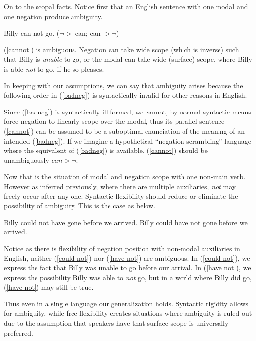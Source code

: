 \documentclass{article}
\begin{document}
On to the scopal facts. Notice first that an English sentence with one modal and one negation produce ambiguity.

\begin{exe}
\ex Billy can not go. \label{cannot}\hfill ($\neg >$ can; can $> \neg$) 
\end{exe}

(\ref{cannot}) is ambiguous. Negation can take wide scope (which is inverse) such that Billy is \emph{unable} to go, or the modal can take wide (surface) scope, where Billy is able \emph{not} to go, if he so pleases.

In keeping with our assumptions, we can say that ambiguity arises because the following order in (\ref{badneg}) is syntactically invalid for other reasons in English.

\begin{exe}
\end{exe}

Since (\ref{badneg}) is syntactically ill-formed, we cannot, by normal syntactic means force negation to linearly scope over the modal, thus its parallel sentence (\ref{cannot}) can be assumed to be a suboptimal enunciation of the meaning of an intended (\ref{badneg}). If we imagine a hypothetical ``negation scrambling'' language where the equivalent of (\ref{badneg}) is available, (\ref{cannot}) should be unambiguously $can > \neg$.

Now that is the situation of modal and negation scope with one non-main verb. However as inferred previously, where there are multiple auxiliaries, \emph{not} may freely occur after any one. Syntactic flexibility should reduce or eliminate the possibility of ambiguity. This is the case as below.

\begin{exe}
\ex Billy could not have gone before we arrived.\label{could not}
\ex Billy could have not gone before we arrived.\label{have not}
\end{exe}

Notice as there is flexibility of negation position with non-modal auxiliaries in English, neither (\ref{could not}) nor (\ref{have not}) are ambiguous. In (\ref{could not}), we express the fact that Billy was unable to go before our arrival. In (\ref{have not}), we express the possibility Billy was able to \emph{not} go, but in a world where Billy did go, (\ref{have not}) may still be true.

Thus even in a single language our generalization holds. Syntactic rigidity allows for ambiguity, while free flexibility creates situations where ambiguity is ruled out due to the assumption that speakers have that surface scope is universally preferred.
\end{document}
